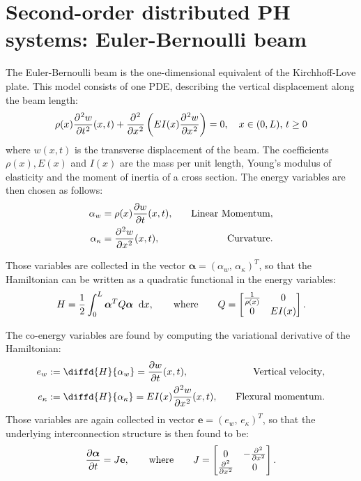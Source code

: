 \documentclass[preprint,12pt]{elsarticle}
\begin{document}
\section{Second-order distributed PH systems: Euler-Bernoulli beam}	
The Euler-Bernoulli beam is the one-dimensional equivalent of the Kirchhoff-Love plate.  This model consists of one PDE, describing the vertical displacement along the beam length:
\begin{equation}
\rho(x) \diffp[2]{w}{t}(x,t) + \displaystyle \diffp[2]{}{x} \left( EI(x) \diffp[2]{w}{x} \right) = 0, \quad x \in (0,L),\, t \ge 0 
\end{equation}
where ${w}(x,t)$ is the transverse displacement of the beam. The coefficients $\rho(x), E(x)$ and $I(x)$  are the mass per unit length, Young's modulus of elasticity and the moment of inertia of a cross section. The energy variables are then chosen as follows:
\begin{equation}
\begin{aligned}
\alpha_{w} &= \rho(x) \diffp{w}{t}(x,t),  &\quad \text{Linear Momentum},\\
\alpha_{\kappa} &= \diffp[2]{w}{x}(x,t), &\quad \text{Curvature}. \\
\end{aligned}
\end{equation}

Those variables are collected in the vector $\bm{\alpha} = (\alpha_{w}, \, \alpha_{\kappa})^T $, so that the Hamiltonian can be written as a quadratic functional in the energy variables: 
\begin{equation}
H = \frac{1}{2} \int_{0}^{L} \bm{\alpha}^T Q \bm{\alpha} \; \d{x},
\qquad \text{where} \qquad
Q = 
\begin{bmatrix}
\frac{1}{\rho(x)} & 0 \\
0 & EI(x) \\
\end{bmatrix}.
\end{equation}

The co-energy variables are found by computing the variational derivative of the Hamiltonian:
\begin{equation}
\begin{aligned}
e_{w} &:= \diffd{H}{\alpha_w} = \diffp{w}{t}(x,t) ,  &\quad \text{Vertical velocity}, \\
e_{\kappa} &:= \diffd{H}{\alpha_{\kappa}} =EI(x) \diffp[2]{w}{x}(x,t),  &\quad \text{Flexural momentum}. \\
\end{aligned}
\end{equation}
Those variables are again collected in vector $\bm{e} = (e_{w}, \, e_{\kappa})^T $, so that the underlying interconnection structure is then found to be:
\begin{equation}
\label{eq:PH_Timo}
\diffp{\bm{\alpha}}{t} = J \mathbf{e},  	\qquad \text{where} \qquad
J = 
\begin{bmatrix}
0 & -\diffp[2]{}{x} \\
\diffp[2]{}{x} & 0 \\
\end{bmatrix}.
\end{equation}
\end{document}
